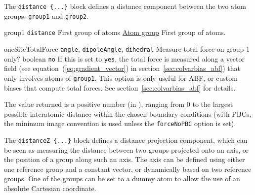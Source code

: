 


The \texttt{distance \{...\}} block defines a distance component between the two atom groups, \texttt{group1} and \texttt{group2}.

\begin{cvcoptions}
\item %
  \key
    {group1}{%
    \texttt{distance}}{%
    First group of atoms}{%
    \hyperref[sec:colvar_atom_groups]{Atom group}}{%
    First group of atoms.}

\item %

\item %
  \keydef
    {oneSiteTotalForce}{%
    \texttt{angle}, \texttt{dipoleAngle}, \texttt{dihedral}}{%
    Measure total force on group 1 only?}{%
    boolean}{%
    \texttt{no}}{%
    If this is set to \texttt{yes}, the total force is measured along
    a vector field (see equation~(\ref{eq:gradient_vector}) in
    section~\ref{sec:colvarbias_abf}) that only involves atoms of
    \texttt{group1}.  This option is only useful for ABF, or custom
    biases that compute total forces.  See
    section~\ref{sec:colvarbias_abf} for details.}

\end{cvcoptions}

The value returned is a positive number (in \lengthunit), ranging from $0$
to the largest possible interatomic distance within the chosen
boundary conditions (with PBCs, the minimum image convention is used
unless the \texttt{forceNoPBC} option is set).



The \texttt{distanceZ~\{...\}} block defines a distance projection
component, which can be seen as measuring the distance between two
groups projected onto an axis, or the position of a group along such
an axis.  The axis can be defined using either one reference group and
a constant vector, or dynamically based on two reference groups.
One of the groups can be set to a dummy atom to allow the use of an absolute Cartesian coordinate.

